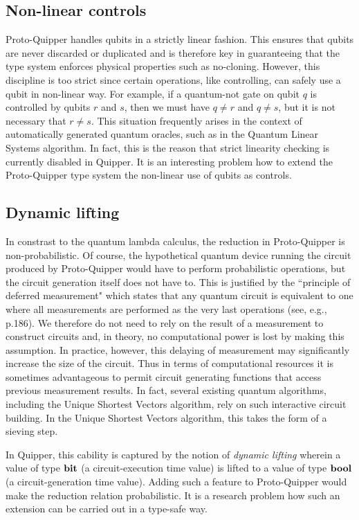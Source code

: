 \documentclass[twoside]{article}
\begin{document}
\subsection{Non-linear controls}

Proto-Quipper handles qubits in a strictly linear fashion. This
ensures that qubits are never discarded or duplicated and is therefore
key in guaranteeing that the type system enforces physical properties
such as no-cloning. However, this discipline is too strict since
certain operations, like controlling, can safely use a qubit in
non-linear way. For example, if a quantum-not gate on qubit $q$ is
controlled by qubits $r$ and $s$, then we must have $q\neq r$ and
$q\neq s$, but it is not necessary that $r\neq s$. This situation
frequently arises in the context of automatically generated quantum
oracles, such as in the Quantum Linear Systems algorithm. In fact,
this is the reason that strict linearity checking is currently
disabled in Quipper. It is an interesting problem how to extend the
Proto-Quipper type system the non-linear use of qubits as controls.

\subsection{Dynamic lifting}

In constrast to the quantum lambda calculus, the reduction in
Proto-Quipper is non-probabilistic. Of course, the hypothetical
quantum device running the circuit produced by Proto-Quipper would
have to perform probabilistic operations, but the circuit generation
itself does not have to. This is justified by the ``principle of
deferred measurement" which states that any quantum circuit is
equivalent to one where all measurements are performed as the very
last operations (see, e.g., \cite{NC02} p.186). We therefore do not
need to rely on the result of a measurement to construct circuits and,
in theory, no computational power is lost by making this
assumption. In practice, however, this delaying of measurement may
significantly increase the size of the circuit. Thus in terms of
computational resources it is sometimes advantageous to permit circuit
generating functions that access previous measurement results. In
fact, several existing quantum algorithms, including the Unique
Shortest Vectors algorithm, rely on such interactive circuit
building. In the Unique Shortest Vectors algorithm, this takes the
form of a sieving step. 

In Quipper, this cability is captured by the notion of \emph{dynamic
  lifting} wherein a value of type $\textrm{\bf bit}$ (a circuit-execution time
value) is lifted to a value of type $\textrm{\bf bool}$ (a circuit-generation time
value). Adding such a feature to Proto-Quipper would make the
reduction relation probabilistic. It is a research problem how such an
extension can be carried out in a type-safe way. 
\end{document}
